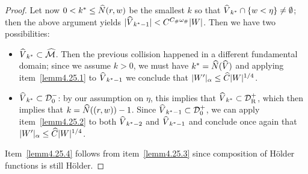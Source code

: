 \documentclass[AHL, Unicode, longabstracts,published]{cedram}
\newcommand{\const}{C_\#}
\newcommand{\cell}{\mathcal{D}}
\newcommand{\csp}{\mathcal{M}}
\newcommand{\cspi}{\widehat{\csp}}
\newcommand{\recoPrivate}{\mathrm{R}}
\newcommand{\backReco}{{\cell^+_{\recoPrivate}}}
\newcommand{\law}[1]{\omega_{#1}}
\newcommand{\lawc}{\law{\#}}
\newcommand{\adm}{_{\alpha^{+}}}
\newcommand{\Np}{\hat N}
\renewcommand{\adm}{_{\alpha}}
\let\oldhat\hat
\renewcommand*{\hat}[1]{\mathchoice{\widehat{#1}}{\widehat{#1}}{\oldhat{#1}}{\oldhat{#1}}}
\begin{document}
\begin{proof}
Let now $0 < k^{*} \le \Np(r,w)$ be the smallest $k$ so that $\hat V_{k^{*}} \cap \{w < \eta\}\not = \emptyset$; then the above argument yields $|\hat V_{k^{*}-1}| < C^{\const\lawc}|W|$. Then we have two possibilities:
\begin{itemize}
\item $\hat V_{k^{*}}\subset\cspi$. Then the previous collision happened in a different fundamental domain; since we assume $k > 0$, we must have $k^{*} = \Np(\hat V)$ and applying item~\eqref{lemm4.25.1} to $\hat V_{k^{*}-1}$ we conclude that $|W'|\adm\le \hat C|W|^{1/4}$.
\item $\hat V_{k^{*}}\subset\cell^{-}_{0}$: by our assumption on $\eta$, this implies that $\hat V_{k^{*}}\subset\backReco$, which then implies that $k = \Np((r,w))-1$. Since $\hat V_{k^{*}-1}\subset\cell^{+}_{0}$, we can apply item~\eqref{lemm4.25.2} to both $\hat{V}_{k^{*}-2}$ and $\hat V_{k^{*}-1}$ and conclude once again that $|W'|\adm\le \hat C|W|^{1/4}$.
\end{itemize}

Item~\eqref{lemm4.25.4} follows from item~\eqref{lemm4.25.3} since composition of H\"older functions is still H\"older.
\end{proof}
\end{document}
